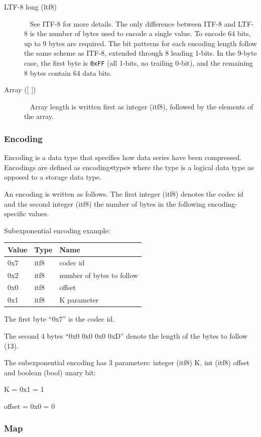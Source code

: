 \documentclass[a4paper]{article}
\begin{document}
\begin{description}
\item[LTF-8 long (ltf8)]\ \newline
See ITF-8 for more details. The only difference between ITF-8 and LTF-8 is the
number of bytes used to encode a single value. To encode 64 bits, up to
9 bytes are required. The bit patterns for each encoding length follow the same
scheme as ITF-8, extended through 8 leading 1-bits. In the 9-byte case, the
first byte is \texttt{0xFF} (all 1-bits, no trailing 0-bit), and the remaining
8 bytes contain 64 data bits.

\item[{Array ([ ])}]\ \newline
Array length is written first as integer (itf8), followed by the elements of the 
array. 
\end{description}


\subsubsection*{Encoding}

Encoding is a data type that specifies how data series have been compressed. Encodings 
are defined as encoding\texttt{<}type\texttt{>} where the type is a logical data 
type as opposed to a storage data type.

An encoding is written as follows. The first integer (itf8) denotes the codec id 
and the second integer (itf8) the number of bytes in the following encoding-specific 
values. 

Subexponential encoding example: 

\begin{tabular}{|l|l|l|}
\hline
\textbf{Value} & \textbf{Type} & \textbf{Name}\tabularnewline
\hline
0x7 & itf8 & codec id\tabularnewline
\hline
0x2 & itf8 & number of bytes to follow\tabularnewline
\hline
0x0 & itf8 & offset\tabularnewline
\hline
0x1 & itf8 & K parameter\tabularnewline
\hline
\end{tabular}

The first byte ``0x7'' is the codec id. 

The second 4 bytes ``0x0 0x0 0x0 0xD'' denote the length of the bytes to follow 
(13). 

The subexponential encoding has 3 parameters: integer (itf8) K, int (itf8) offset 
and boolean (bool) unary bit: 

K = 0x1 = 1

offset = 0x0 = 0

\subsubsection*{Map}
\end{document}
